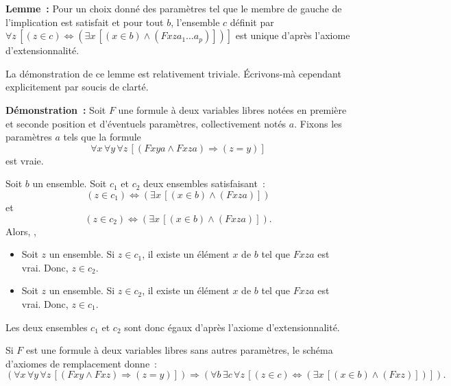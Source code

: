 \medskip

\noindent\textbf{Lemme :} Pour un choix donné des paramètres tel que le membre de gauche de l'implication est satisfait et pour tout $b$, l'ensemble $c$ définit par $\forall z \, \left[ (z \in c) \Leftrightarrow (\exists x \, [(x \in b) \wedge (F x z a_1 \dots a_p)]) \right]$ est unique d'après l'axiome d'extensionnalité.

\medskip

La démonstration de ce lemme est relativement triviale. 
Écrivons-mà cependant explicitement par soucis de clarté. 

\medskip

\noindent\textbf{Démonstration :} 
    Soit $F$ une formule à deux variables libres notées en première et seconde position et d'éventuels paramètres, collectivement notés $a$. 
    Fixons les paramètres $a$ tels que la formule
    \begin{equation*}
        \forall x \, \forall y \, \forall z \, \left[
            (F x y a \wedge F x z a) \Rightarrow (z = y)
        \right]
    \end{equation*}
    est vraie. 
    
    Soit $b$ un ensemble. 
    Soit $c_1$ et $c_2$ deux ensembles satisfaisant : 
    \begin{equation*}
        (z \in c_1) \Leftrightarrow (\exists x \, [(x \in b) \wedge (F x z a)])
    \end{equation*}
    et 
    \begin{equation*}
        (z \in c_2) \Leftrightarrow (\exists x \, [(x \in b) \wedge (F x z a)]) .
    \end{equation*}
    Alors, ,
    \begin{itemize}[nosep]
        \item Soit $z$ un ensemble. 
            Si $z \in c_1$, il existe un élément $x$ de $b$ tel que $F x z a$ est vrai. 
            Donc, $z \in c_2$.
        \item Soit $z$ un ensemble. 
            Si $z \in c_2$, il existe un élément $x$ de $b$ tel que $F x z a$ est vrai. 
            Donc, $z \in c_1$.
    \end{itemize}
    Les deux ensembles $c_1$ et $c_2$ sont donc égaux d'après l'axiome d'extensionnalité.

   \done 

\medskip

Si $F$ est une formule à deux variables libres sans autres paramètres, le schéma d'axiomes de remplacement donne :
\begin{equation*}
    \left( 
        \forall x \, \forall y \, \forall z \, \left[
            (F x y \wedge F x z) \Rightarrow (z = y)
        \right]
    \right)
    \Rightarrow
    \left(
        \forall b \, \exists c \, \forall z \, \left[
            (z \in c) \Leftrightarrow (\exists x \, [(x \in b) \wedge (F x z)])
        \right]
    \right)
.
\end{equation*}

